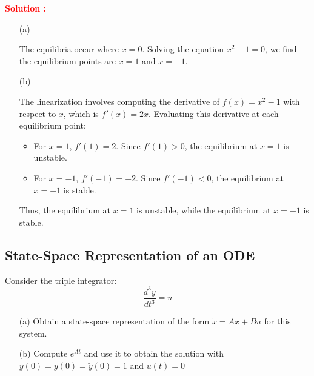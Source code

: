 \documentclass[12pt]{article}
\begin{document}
\textbf{\textcolor{red}{Solution :}}
\begin{enumerate}
\item[(a)] 


The equilibria occur where $\dot{x} = 0$. Solving the equation $x^2 - 1 = 0$, we find the equilibrium points are $x = 1$ and $x = -1$.

\item[(b)] 


The linearization involves computing the derivative of $f(x) = x^2 - 1$ with respect to $x$, which is $f'(x) = 2x$. Evaluating this derivative at each equilibrium point:

\begin{itemize}
    \item For $x = 1$, $f'(1) = 2$. Since $f'(1) > 0$, the equilibrium at $x = 1$ is unstable.
    \item For $x = -1$, $f'(-1) = -2$. Since $f'(-1) < 0$, the equilibrium at $x = -1$ is stable.
\end{itemize}
Thus, the equilibrium at $x = 1$ is unstable, while the equilibrium at $x = -1$ is stable.

\end{enumerate}

\clearpage
\subsection{State-Space Representation of an ODE}

Consider the triple integrator:
\begin{equation}
    \frac{d^3y}{dt^3} = u
\end{equation}
\begin{enumerate}
    \item[(a)] Obtain a state-space representation of the form \(\dot{x} = Ax + Bu\) for this system.

    \item[(b)] Compute \(e^{At}\) and use it to obtain the solution with \(y(0) = \dot{y}(0) = \ddot{y}(0) = 1\) and \(u(t) = 0\)
\end{enumerate}
\end{document}
